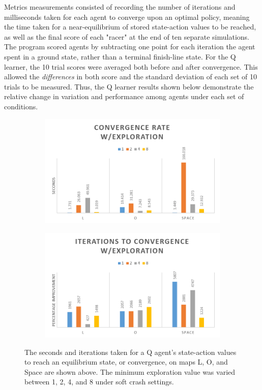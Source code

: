 \documentclass[12pt, letter]{article}
\begin{document}
Metrics measurements consisted of recording the number of iterations and milliseconds taken for each agent to converge upon an optimal policy, meaning the time taken for a near-equilibrium of stored state-action values to be reached, as well as the final score of each "racer" at the end of ten separate simulations.  The program scored agents by subtracting one point for each iteration the agent spent in a ground state, rather than a terminal finish-line state.  For the Q learner, the 10 trial scores were averaged both before and after convergence.  This allowed the \emph{differences} in both score and the standard deviation of each set of 10 trials to be measured.  Thus, the Q learner results shown below demonstrate the relative change in variation and performance among agents under each set of conditions.

\begin{figure}[h] 
    \centering
    \begin{subfigure}[b]{0.48\textwidth}
        \includegraphics[width=1\textwidth]{img/minE/Time}
    \end{subfigure}
    \begin{subfigure}[b]{0.48\textwidth}
        \includegraphics[width=1\textwidth]{img/minE/Iter}
    \end{subfigure}
    \caption{The seconds and iterations taken for a Q agent's state-action values to reach an equilibrium state, or convergence, on maps L, O, and Space are shown above. The minimum exploration value was varied between 1, 2, 4, and 8 under soft crash settings.}
    \label{fig:minETimeIter}
\end{figure}
\end{document}
